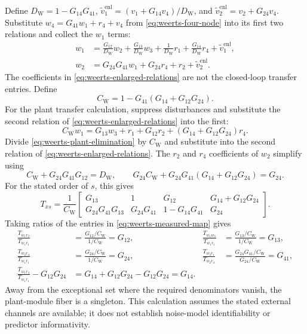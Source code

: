 \documentclass[11pt,a4paper]{article}
\begin{document}
Define $D_{\mathrm W}=1-G_{14}G_{41}$, $\widetilde v_1^{\mathrm{enl}}=(v_1+G_{14}v_4)/D_{\mathrm W}$, and $\widetilde v_2^{\mathrm{enl}}=v_2+G_{24}v_4$.  Substitute $w_4=G_{41}w_1+r_4+v_4$ from \eqref{eq:weerts-four-node} into its first two relations and collect the $w_1$ terms:
\begin{align}
  w_1
  &=\frac{G_{12}}{D_{\mathrm W}}w_2
    +\frac{G_{13}}{D_{\mathrm W}}w_3
    +\frac{1}{D_{\mathrm W}}r_1
    +\frac{G_{14}}{D_{\mathrm W}}r_4
    +\widetilde v_1^{\mathrm{enl}},\\
  w_2
  &=G_{24}G_{41}w_1+G_{24}r_4+r_2+\widetilde v_2^{\mathrm{enl}}.
  \label{eq:weerts-enlarged-relations}
\end{align}
The coefficients in \eqref{eq:weerts-enlarged-relations} are not the closed-loop transfer entries.  Define
\[
  C_{\mathrm W}=1-G_{41}(G_{14}+G_{12}G_{24}).
\]
For the plant transfer calculation, suppress disturbances and substitute the second relation of \eqref{eq:weerts-enlarged-relations} into the first:
\begin{equation}
  C_{\mathrm W}w_1
  =G_{13}w_3+r_1+G_{12}r_2+(G_{14}+G_{12}G_{24})r_4.
  \label{eq:weerts-plant-elimination}
\end{equation}
Divide \eqref{eq:weerts-plant-elimination} by $C_{\mathrm W}$ and substitute into the second relation of \eqref{eq:weerts-enlarged-relations}.  The $r_2$ and $r_4$ coefficients of $w_2$ simplify using
\[
  C_{\mathrm W}+G_{24}G_{41}G_{12}=D_{\mathrm W},
  \qquad
  G_{24}C_{\mathrm W}+G_{24}G_{41}(G_{14}+G_{12}G_{24})=G_{24}.
\]
For the stated order of $s$, this gives
\begin{equation}
  T_{xs}=\frac{1}{C_{\mathrm W}}
  \begin{bmatrix}
    G_{13}&1&G_{12}&G_{14}+G_{12}G_{24}\\
    G_{24}G_{41}G_{13}&G_{24}G_{41}&1-G_{14}G_{41}&G_{24}
  \end{bmatrix}.
  \label{eq:weerts-measured-map}
\end{equation}
Taking ratios of the entries in \eqref{eq:weerts-measured-map} gives
\begin{align}
  \frac{T_{w_1r_2}}{T_{w_1r_1}}
    &=\frac{G_{12}/C_{\mathrm W}}{1/C_{\mathrm W}}=G_{12},
  &\frac{T_{w_1w_3}}{T_{w_1r_1}}
    &=\frac{G_{13}/C_{\mathrm W}}{1/C_{\mathrm W}}=G_{13},\\
  \frac{T_{w_2r_4}}{T_{w_1r_1}}
    &=\frac{G_{24}/C_{\mathrm W}}{1/C_{\mathrm W}}=G_{24},
  &\frac{T_{w_2r_1}}{T_{w_2r_4}}
    &=\frac{G_{24}G_{41}/C_{\mathrm W}}{G_{24}/C_{\mathrm W}}=G_{41},\\
  \frac{T_{w_1r_4}}{T_{w_1r_1}}-G_{12}G_{24}
    &=G_{14}+G_{12}G_{24}-G_{12}G_{24}=G_{14}.
  \label{eq:weerts-recovery-row1}
\end{align}
Away from the exceptional set where the required denominators vanish, the plant-module fiber is a singleton.  This calculation assumes the stated external channels are available; it does not establish noise-model identifiability or predictor informativity.
\end{document}
